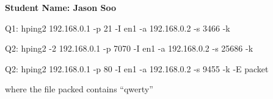 \documentclass[11pt]{article}
\begin{document}
	\textbf{Student Name: Jason Soo}

	Q1: hping2 192.168.0.1 -p 21 -I en1 -a 192.168.0.2 -s 3466 -k 
	
	Q2: hping2 -2 192.168.0.1 -p 7070 -I en1 -a 192.168.0.2 -s 25686 -k 
	
		Q2: hping2 192.168.0.1 -p 80 -I en1 -a 192.168.0.2 -s 9455 -k -E packet
		
		where the file packed contains ``qwerty''
\end{document}
